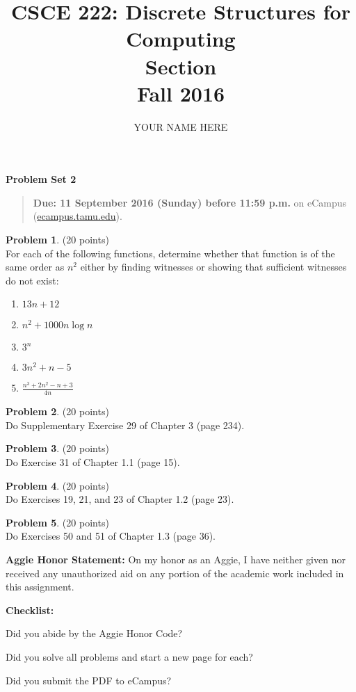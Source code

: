 \documentclass{article}
\title{CSCE 222: Discrete Structures for Computing\\Section \mysectionnumber\\Fall 2016}
\author{YOUR NAME HERE}
\theoremstyle{definition}
\newtheorem{problem}{Problem}
\newtheorem*{solution}{Solution}
\newcommand{\honor}{\noindent \textbf{Aggie Honor Statement: }On my honor as an Aggie, I have neither
  given nor received any unauthorized aid on any portion of the academic work included in this assignment.
}
\newcommand{\checklist}{\noindent\textbf{Checklist:}
\begin{compactenum}
\item Did you abide by the Aggie Honor Code?
\item Did you solve all problems and start a new page for each? 
\item Did you submit the PDF to eCampus?
\end{compactenum}
}
\newcommand{\problemset}[1]{\begin{center}\textbf{Problem Set #1}\end{center}}
\newcommand{\duedate}[1]{\begin{quote}\textbf{Due: #1} on eCampus (\url{ecampus.tamu.edu}).\end{quote}}
\begin{document}
\maketitle

\problemset{2}

\duedate{11 September 2016 (Sunday) before 11:59 p.m.}

\bigskip

\begin{problem} (20 points)\\
For each of the following functions, determine whether that function is of the same order as $n^2$ either by finding witnesses or showing that sufficient witnesses do not exist:
\begin{enumerate}
\item $13n+12$
\item $n^2+1000 n\log{n}$
\item $3^n$
\item $3n^2+n-5$
\item $\displaystyle \frac{n^3+2n^2-n+3}{4n}$
\end{enumerate}
\end{problem}



\begin{problem} (20 points)\\
Do Supplementary Exercise 29 of Chapter 3 (page 234).
\end{problem}



\begin{problem} (20 points)\\
Do  Exercise 31 of Chapter 1.1 (page 15).
\end{problem}



\begin{problem} (20 points)\\
Do  Exercises 19, 21, and 23 of Chapter 1.2 (page 23).
\end{problem}



\begin{problem} (20 points)\\
Do  Exercises 50 and 51 of Chapter 1.3 (page 36).
\end{problem}

\bigskip
\honor

\bigskip
\checklist
\end{document}
